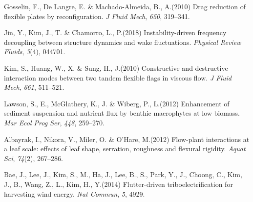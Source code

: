 \documentclass[lineno,authoryear]{FLO_v1}%
\theoremstyle{definition}
\begin{document}
\begin{Backmatter}
\begin{thebibliography}{}
Gosselin, F., De Langre, E. {\&} Machado-Almeida, B., A.(2010)
Drag reduction of flexible plates by reconfiguration.
	\textit{J Fluid Mech}, \textit{650}, 319--341.

Jin, Y., Kim, J., T. {\&} Chamorro, L., P.(2018)
Instability-driven frequency decoupling between structure dynamics and wake fluctuations.
	\textit{Physical Review Fluids}, \textit{3}(4), 044701.

Kim, S., Huang, W., X. {\&} Sung, H., J.(2010)
Constructive and destructive interaction modes between two tandem flexible flags in viscous flow.
	\textit{J Fluid Mech}, \textit{661}, 511--521.

Lawson, S., E., McGlathery, K., J. {\&} Wiberg, P., L.(2012)
Enhancement of sediment suspension and nutrient flux by benthic macrophytes at low biomass.
	\textit{Mar Ecol Prog Ser}, \textit{448}, 259--270.

Albayrak, I., Nikora, V., Miler, O. {\&} O’Hare, M.(2012)
Flow-plant interactions at a leaf scale: effects of leaf shape, serration, roughness and flexural rigidity.
	\textit{Aquat Sci}, \textit{74}(2), 267--286.

Bae, J., Lee, J., Kim, S., M., Ha, J., Lee, B., S., Park, Y., J., Choong, C., Kim, J., B., Wang, Z., L., Kim, H., Y.(2014)
Flutter-driven triboelectrification for harvesting wind energy.
	\textit{Nat Commun}, \textit{5}, 4929.
	
	



\end{thebibliography}



\end{Backmatter}
\end{document}
